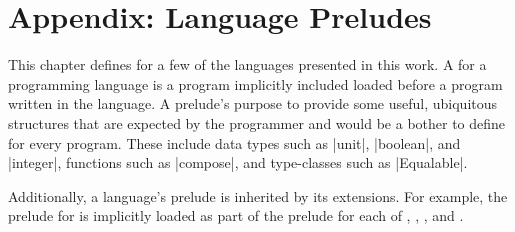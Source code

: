 \chapter{Appendix: Language Preludes}
\label{app:preludes}

This chapter defines  for a few of the languages presented in this work.
A  for a programming language is a program implicitly included loaded before a program written in the language.
A prelude's purpose to provide some useful, ubiquitous structures that are expected by the programmer and would be a bother to define for every program.
These include
data types such as \code|unit|, \code|boolean|, and \code|integer|,
functions such as \code|compose|, and
type-classes such as \code|Equalable|.


Additionally, a language's prelude is inherited by its extensions.
For example, the prelude for \LangA is implicitly loaded as part of the prelude for each of \LangB, \LangC, \LangD, and \LangE.


% 

% 
% 
